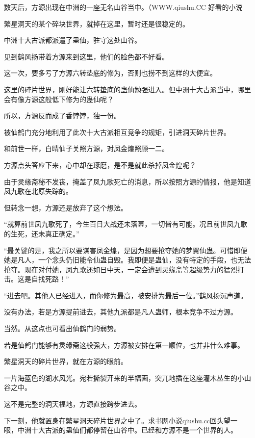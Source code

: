 
\begin{this_body}

数天后，方源出现在中洲的一座无名山谷当中。（WWW.qiushu.CC 好看的小说

繁星洞天的某个碎块世界，就掉在这里，暂时还是很稳定的。

中洲十大古派都派遣了蛊仙，驻守这处山谷。

见到鹤风扬带着方源来到这里，他们的脸色都不好看。

这一次，要多亏了方源六转垫底的修为，否则也捞不到这样的大便宜。

这里的碎片世界，刚好能让六转垫底的蛊仙勉强进入。但中洲十大古派当中，哪里会有像方源这般低下修为的蛊仙呢？

所以，方源反而成了香饽饽，独一份。

被仙鹤门充分地利用了此次十大古派相互竞争的规矩，引进洞天碎片世界。

和前世一样，白晴仙子关照方源，对凤金煌照顾一二。

方源点头答应下来，心中却在琢磨，是不是就此杀掉凤金煌呢？

由于灵缘斋秘不发丧，掩盖了凤九歌死亡的消息，所以按照方源的情报，他是知道凤九歌在北原失踪的。

但转念一想，方源还是放弃了这个想法。

“就算前世凤九歌死了，今生百日大战还未落幕，一切皆有可能。况且前世凤九歌的生死，还未真正确定。”

“最关键的是，我之所以要谋害凤金煌，是因为想要抢夺她的梦翼仙蛊。可惜即便她是凡人，一个念头仍旧能令仙蛊自毁。我即便是蛊仙，没有特定的手段，也无法抢夺。现在对付她，凤九歌还如日中天，一定会遭到灵缘斋等超级势力的猛烈打击。这是自找死路！”

“进去吧。其他人已经进入，而你修为最高，被安排为最后一位。”鹤风扬沉声道。

没有办法，若是方源提前进去，其他九派都是凡人蛊师，根本竞争不过方源。

当然。从这点也可看出仙鹤门的弱势。

若是仙鹤门能够有灵缘斋这般强大，方源被安排在第一顺位，也并非什么难事。

繁星洞天的碎片世界，就在方源的眼前。

一片海蓝色的湖水风光。宛若撕裂开来的半幅画，突兀地插在这座灌木丛生的小山谷之中。

这不是完整的洞天福地，方源直接跨步进去。

下一刻，他就置身在繁星洞天碎片世界之中了。求书网小说qiushu.cc回头望一眼，中洲十大古派的蛊仙们都停留在山谷中。已经和方源不是一个世界的人。


\end{this_body}
